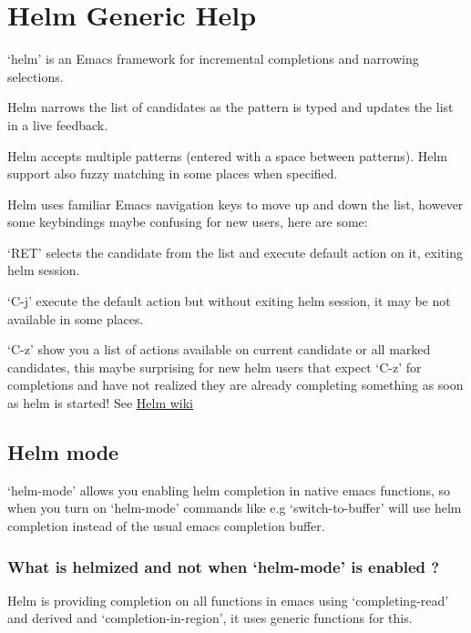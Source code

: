 \documentclass[11pt]{article}
\author{n}
\date{\today}
\title{}
\begin{document}
\tableofcontents

\section{Helm Generic Help}
\label{sec:orgadf110a}

‘helm’ is an Emacs framework for incremental
completions and narrowing selections.

Helm narrows the list of candidates as the pattern is typed and
updates the list in a live feedback.

Helm accepts multiple patterns (entered with a space between patterns).
Helm support also fuzzy matching in some places when specified.

Helm uses familiar Emacs navigation keys to move up and down the list,
however some keybindings maybe confusing for new users, here are some:

‘RET’ selects the candidate from the list and execute default action
on it, exiting helm session.

‘C-j’ execute the default action
but without exiting helm session, it may be not available in some places.

‘C-z’ show you a list of actions
available on current candidate or all marked candidates, this maybe
surprising for new helm users that expect
‘C-z’ for completions and have not
realized they are already completing something as soon as helm is
started! See \href{https://github.com/emacs-helm/helm/wiki\#helm-completion-vs-emacs-completion}{Helm wiki}

\subsection{Helm mode}
\label{sec:org7891df8}

‘helm-mode’ allows you enabling helm completion in native emacs functions,
so when you turn on ‘helm-mode’ commands like e.g ‘switch-to-buffer’ will use
helm completion instead of the usual emacs completion buffer.

\subsubsection{What is helmized and not when ‘helm-mode’ is enabled ?}
\label{sec:orgf6b8e6d}

Helm is providing completion on all functions in emacs using ‘completing-read’
and derived and ‘completion-in-region’, it uses generic functions for this.
\end{document}
